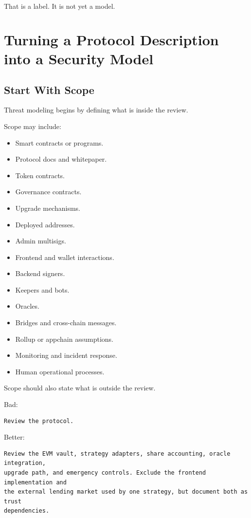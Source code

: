 That is a label. It is not yet a model.

\section{Turning a Protocol Description into a Security Model}

\subsection{Start With Scope}

Threat modeling begins by defining what is inside the review.

Scope may include:

\begin{itemize}
\tightlist
\item
  Smart contracts or programs.
\item
  Protocol docs and whitepaper.
\item
  Token contracts.
\item
  Governance contracts.
\item
  Upgrade mechanisms.
\item
  Deployed addresses.
\item
  Admin multisigs.
\item
  Frontend and wallet interactions.
\item
  Backend signers.
\item
  Keepers and bots.
\item
  Oracles.
\item
  Bridges and cross-chain messages.
\item
  Rollup or appchain assumptions.
\item
  Monitoring and incident response.
\item
  Human operational processes.
\end{itemize}

Scope should also state what is outside the review.

Bad:

\begin{lstlisting}
Review the protocol.
\end{lstlisting}

Better:

\begin{lstlisting}
Review the EVM vault, strategy adapters, share accounting, oracle integration,
upgrade path, and emergency controls. Exclude the frontend implementation and
the external lending market used by one strategy, but document both as trust
dependencies.
\end{lstlisting}

